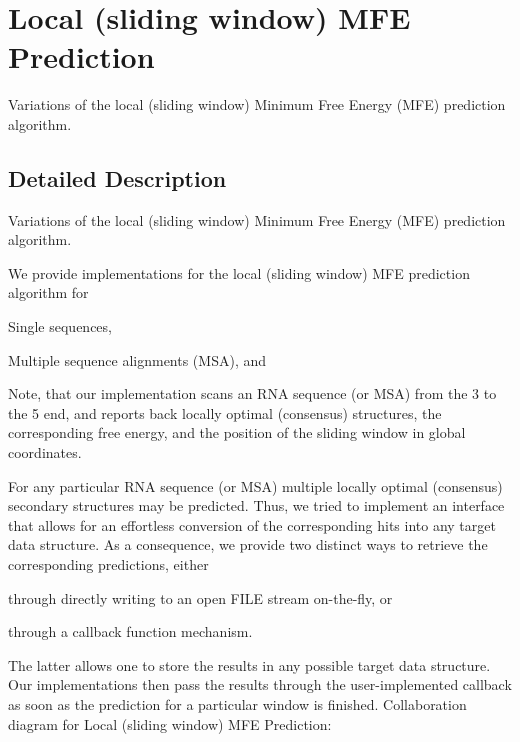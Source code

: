 \hypertarget{group__mfe__window}{}\section{Local (sliding window) M\+FE Prediction}
\label{group__mfe__window}


Variations of the local (sliding window) Minimum Free Energy (M\+FE) prediction algorithm.  




\subsection{Detailed Description}
Variations of the local (sliding window) Minimum Free Energy (M\+FE) prediction algorithm. 

We provide implementations for the local (sliding window) M\+FE prediction algorithm for
\begin{DoxyItemize}
\item Single sequences,
\item Multiple sequence alignments (M\+SA), and
\end{DoxyItemize}

Note, that our implementation scans an R\+NA sequence (or M\+SA) from the 3\textquotesingle{} to the 5\textquotesingle{} end, and reports back locally optimal (consensus) structures, the corresponding free energy, and the position of the sliding window in global coordinates.

For any particular R\+NA sequence (or M\+SA) multiple locally optimal (consensus) secondary structures may be predicted. Thus, we tried to implement an interface that allows for an effortless conversion of the corresponding hits into any target data structure. As a consequence, we provide two distinct ways to retrieve the corresponding predictions, either
\begin{DoxyItemize}
\item through directly writing to an open {\ttfamily F\+I\+LE} stream on-\/the-\/fly, or
\item through a callback function mechanism.
\end{DoxyItemize}

The latter allows one to store the results in any possible target data structure. Our implementations then pass the results through the user-\/implemented callback as soon as the prediction for a particular window is finished. Collaboration diagram for Local (sliding window) M\+FE Prediction\+:
